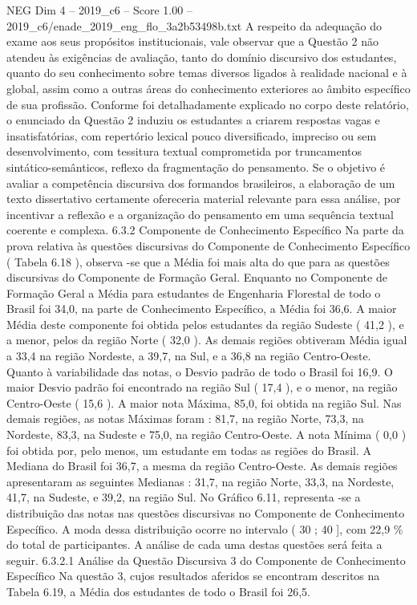 \begin{textsample}{NEG Dim 4 – 2019\_c6 – Score 1.00 – 2019\_c6/enade\_2019\_eng\_flo\_3a2b53498b.txt}
A respeito da adequação do exame aos seus propósitos institucionais, vale observar que a Questão 2 não atendeu às exigências de avaliação, tanto do domínio discursivo dos estudantes, quanto do seu conhecimento sobre temas diversos ligados à realidade nacional e à global, assim como a outras áreas do conhecimento exteriores ao âmbito específico de sua profissão.
Conforme foi detalhadamente explicado no corpo deste relatório, o enunciado da Questão 2 induziu os estudantes a criarem respostas vagas e insatisfatórias, com repertório lexical pouco diversificado, impreciso ou sem desenvolvimento, com tessitura textual comprometida por truncamentos sintático-semânticos, reflexo da fragmentação do pensamento.
Se o objetivo é avaliar a competência discursiva dos formandos brasileiros, a elaboração de um texto dissertativo certamente ofereceria material relevante para essa análise, por incentivar a reflexão e a organização do pensamento em uma sequência textual coerente e complexa. 6.3.2 Componente de Conhecimento Específico Na parte da prova relativa às questões discursivas do Componente de Conhecimento Específico ( Tabela 6.18 ), observa -se que a Média foi mais alta do que para as questões discursivas do Componente de Formação Geral.
Enquanto no Componente de Formação Geral a Média para estudantes de Engenharia Florestal de todo o Brasil foi 34,0, na parte de Conhecimento Específico, a Média foi 36,6.
A maior Média deste componente foi obtida pelos estudantes da região Sudeste ( 41,2 ), e a menor, pelos da região Norte ( 32,0 ).
As demais regiões obtiveram Média igual a 33,4 na região Nordeste, a 39,7, na Sul, e a 36,8 na região Centro-Oeste.
Quanto à variabilidade das notas, o Desvio padrão de todo o Brasil foi 16,9.
O maior Desvio padrão foi encontrado na região Sul ( 17,4 ), e o menor, na região Centro-Oeste ( 15,6 ).
A maior nota Máxima, 85,0, foi obtida na região Sul.
Nas demais regiões, as notas Máximas foram : 81,7, na região Norte, 73,3, na Nordeste, 83,3, na Sudeste e 75,0, na região Centro-Oeste.
A nota Mínima ( 0,0 ) foi obtida por, pelo menos, um estudante em todas as regiões do Brasil.
A Mediana do Brasil foi 36,7, a mesma da região Centro-Oeste.
As demais regiões apresentaram as seguintes Medianas : 31,7, na região Norte, 33,3, na Nordeste, 41,7, na Sudeste, e 39,2, na região Sul.
No Gráfico 6.11, representa -se a distribuição das notas nas questões discursivas no Componente de Conhecimento Específico.
A moda dessa distribuição ocorre no intervalo ( 30 ; 40 ], com 22,9 \% do total de participantes.
A análise de cada uma destas questões será feita a seguir. 6.3.2.1 Análise da Questão Discursiva 3 do Componente de Conhecimento Específico Na questão 3, cujos resultados aferidos se encontram descritos na Tabela 6.19, a Média dos estudantes de todo o Brasil foi 26,5.

\end{textsample}

